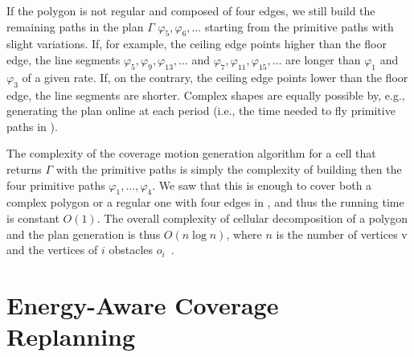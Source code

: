 If the polygon is not regular and composed of four edges, we still build the remaining paths in the plan $\Gamma$ $\varphi_5,\varphi_6,\dots$ starting from the primitive paths with slight variations. If, for example, the ceiling edge points higher than the floor edge, the line segments $\varphi_5,\varphi_9,\varphi_{13},\dots$ and $\varphi_7,\varphi_{11},\varphi_{15},\dots$ are longer than $\varphi_{1}$ and $\varphi_3$ of a given rate. If, on the contrary, the ceiling edge points lower than the floor edge, the line segments are shorter. Complex shapes are equally possible by, e.g., generating the plan online at each period (i.e., the time needed to fly primitive paths in ). 

The complexity of the coverage motion generation algorithm for a cell that returns $\Gamma$ with the primitive paths is simply the complexity of building then the four primitive paths $\varphi_1,\dots,\varphi_4$. We saw that this is enough to cover both a complex polygon or a regular one with four edges in , and thus the running time is constant $O(1)$. The overall complexity of cellular decomposition of a polygon and the plan generation is thus $O(n\log{n})$, where $n$ is the number of vertices v and the vertices of $i$ obstacles $o_i$~\citep{choset2000exact}.




%


\section{Energy-Aware Coverage Replanning}
\label{sec:mpc}

